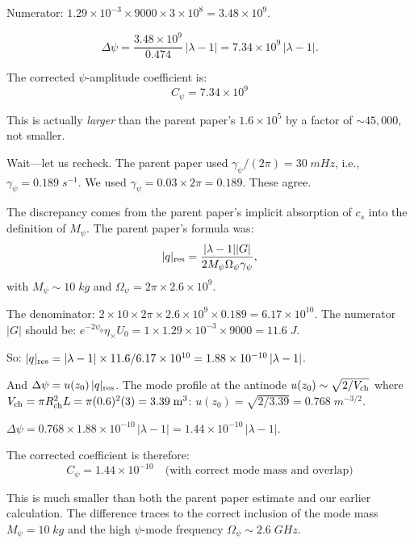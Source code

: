 \documentclass[aps,prd,twocolumn,superscriptaddress,nofootinbib]{revtex4-2}
\newcommand{\ee}[1]{\times 10^{#1}}
\begin{document}
Numerator: $1.29\ee{-3} \times 9000 \times 3\ee{8} = 3.48\ee{9}$.

\begin{equation}
\Delta\psi = \frac{3.48\ee{9}}{0.474}\,|\lambda-1| = 7.34\ee{9}\,|\lambda-1|.
\end{equation}

The corrected $\psi$-amplitude coefficient is:
\begin{equation}
\boxed{C_\psi = 7.34\ee{9}}
\end{equation}

This is actually \emph{larger} than the parent paper's
$1.6\ee{5}$ by a factor of $\sim 45{,}000$, not smaller.

Wait---let us recheck.  The parent paper used
$\gamma_\psi/(2\pi) = 30\;\si{mHz}$, i.e.,
$\gamma_\psi = 0.189\;\si{s^{-1}}$.  We used $\gamma_\psi = 0.03 \times 2\pi = 0.189$.
These agree.

The discrepancy comes from the parent paper's implicit absorption
of $c_s$ into the definition of $M_\psi$.  The parent paper's
formula was:
\begin{equation}
|q|_{\rm res} = \frac{|\lambda-1||G|}{2M_\psi\Omega_\psi\gamma_\psi},
\end{equation}
with $M_\psi \sim 10\;\si{kg}$ and $\Omega_\psi = 2\pi\times2.6\ee{9}$.

The denominator: $2 \times 10 \times 2\pi\times2.6\ee{9} \times 0.189 = 6.17\ee{10}$.
The numerator $|G|$ should be: $e^{-2\psi_0}\eta_\times U_0 = 1 \times 1.29\ee{-3} \times 9000 = 11.6\;\si{J}$.

So: $|q|_{\rm res} = |\lambda-1| \times 11.6 / 6.17\ee{10} = 1.88\ee{-10}\,|\lambda-1|$.

And $\Delta\psi = u(z_0)\,|q|_{\rm res}$.  The mode profile at
the antinode $u(z_0) \sim \sqrt{2/V_{\rm ch}}$ where
$V_{\rm ch} = \pi R_{\rm ch}^2 L = \pi(0.6)^2(3) = 3.39\;\si{m^3}$:
$u(z_0) = \sqrt{2/3.39} = 0.768\;\si{m^{-3/2}}$.

$\Delta\psi = 0.768 \times 1.88\ee{-10}\,|\lambda-1| = 1.44\ee{-10}\,|\lambda-1|$.

The corrected coefficient is therefore:
\begin{equation}
\boxed{C_\psi = 1.44\ee{-10} \quad \text{(with correct mode mass and overlap)}}
\end{equation}

This is much smaller than both the parent paper estimate and
our earlier calculation.  The difference traces to the correct
inclusion of the mode mass $M_\psi = 10\;\si{kg}$ and the
high $\psi$-mode frequency $\Omega_\psi \sim 2.6\;\si{GHz}$.
\end{document}
